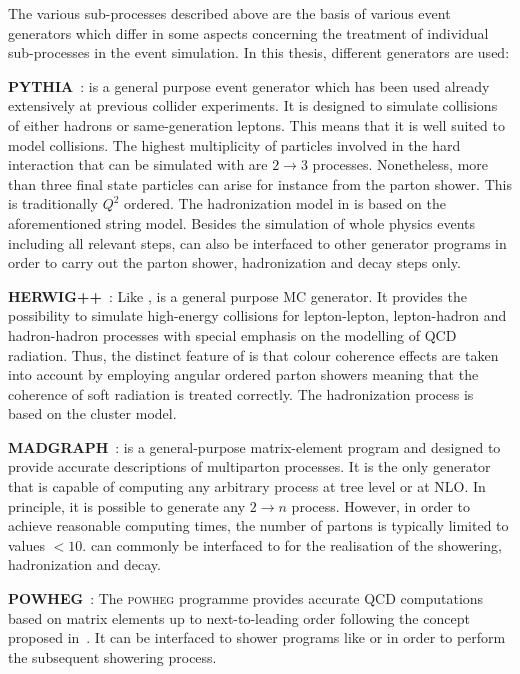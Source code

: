 The various sub-processes described above are the basis of various event generators which differ in some aspects concerning the treatment of individual sub-processes in the event simulation. In this thesis, different generators are used:
\begin{description}
 \item \textbf{PYTHIA}~\cite{Sjostrand:2006za}: \pythia is a general purpose event generator which has been used already extensively at previous collider experiments. It is designed to simulate collisions of either hadrons or same-generation leptons. This means that it is well suited to model \pp collisions. The highest multiplicity of particles involved in the hard interaction that can be simulated with \pythia are $2 \rightarrow 3$ processes. Nonetheless, more than three final state particles can arise for instance from the parton shower. This is traditionally $Q^2$ ordered. The hadronization model in \pythia is based on the aforementioned string model. Besides the simulation of whole physics events including all relevant steps, \pythia can also be interfaced to other generator programs in order to carry out the parton shower, hadronization and decay steps only.
 \item \textbf{HERWIG++}~\cite{Bahr:2008pv}: Like \pythia, \herwig is a general purpose MC generator. It provides the possibility to simulate high-energy collisions for lepton-lepton, lepton-hadron and hadron-hadron processes with special emphasis on the modelling of QCD radiation. Thus, the distinct feature of \herwig is that colour coherence effects are taken into account by employing angular ordered parton showers meaning that the coherence of soft radiation is treated correctly. The hadronization process is based on the cluster model. 
 \item \textbf{MADGRAPH}~\cite{Alwall:2007st, Alwall:2014hca}: \madgraph is a general-purpose matrix-element program and designed to provide accurate descriptions of multiparton processes. It is the only generator that is capable of computing any arbitrary process at tree level or at NLO. In principle, it is possible to generate any $2 \rightarrow n$ process. However, in order to achieve reasonable computing times, the number of partons is typically limited to values $< 10$. \madgraph can commonly be interfaced to \pythia for the realisation of the showering, hadronization and decay.
 \item \textbf{POWHEG}~\cite{Oleari:2010nx}: The \textsc{powheg} programme provides accurate QCD computations based on matrix elements up to next-to-leading order following the concept proposed in~\cite{Nason:2004rx}. It can be interfaced to shower programs like \pythia or \herwig in order to perform the subsequent showering process.   
\end{description}
